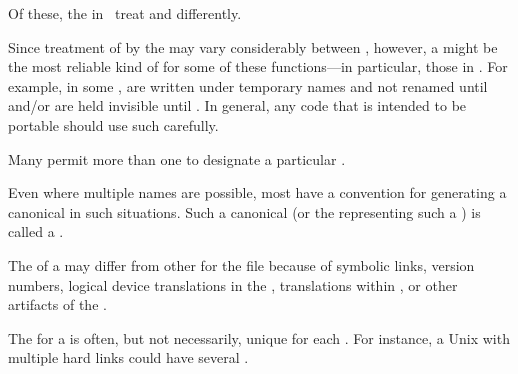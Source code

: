 Of these, the  in \thenextfigure\ treat  and 
  differently.


Since treatment of   by the  
may vary considerably between , however, 
a   might be the most reliable kind of
 for some of these functions---in particular, those in
\thenextfigure.  For example, in some , 
  are written under temporary names 
and not renamed until 
and/or are held invisible until .
In general, any code that is intended to be portable should
use such  carefully.


\endsubsection%


Many  permit more than one  to designate 
a particular .

Even where multiple names are possible, most  have a convention
for generating a canonical  in such situations.  Such a canonical
 (or the  representing such a ) is
called a .  

The  of a  may differ from other 
for the file because of
     symbolic links,
     version numbers,
     logical device translations in the ,
      translations within \clisp,
  or other artifacts of the .

The  for a  is often, but not necessarily, unique for
each .  For instance, a Unix  with multiple hard links 
could have several .


